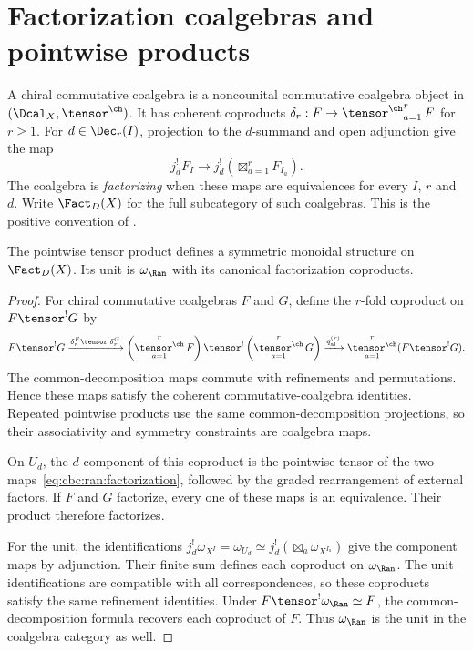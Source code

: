 \section{Factorization coalgebras and pointwise products}
A chiral commutative coalgebra is a noncounital commutative coalgebra
object in $(\Dcal_X,\tensor^{\ch})$.
It has coherent coproducts
$\delta_r:F\to\mathop{\tensor^{\ch}}_{a=1}^r F$ for $r\geq1$.
For $d\in\Dec_r(I)$, projection to the $d$-summand and open adjunction
give the map
\begin{equation}
 j_d^!F_I\longrightarrow
 j_d^!\left(\mathop{\boxtimes}_{a=1}^rF_{I_a}\right).
 \label{eq:cbc:ran:factorization}
\end{equation}
The coalgebra is \emph{factorizing} when these maps are equivalences
for every $I$, $r$ and $d$.
Write $\Fact_D(X)$ for the full subcategory of such coalgebras.
This is the positive convention of \cite[\S2.4]{FG12}.

\begin{proposition}
\label{cbc:ran:pointwise}
The pointwise tensor product defines a symmetric monoidal structure
on $\Fact_D(X)$. Its unit is $\omega_{\Ran}$ with its canonical
factorization coproducts.
\end{proposition}
\begin{proof}
For chiral commutative coalgebras $F$ and $G$, define the $r$-fold
coproduct on $F\tensor^!G$ by
\[
 F\tensor^!G
 \xrightarrow{\delta_r^F\tensor^!\delta_r^G}
 \left(\mathop{\tensor^{\ch}}_{a=1}^rF\right)
 \tensor^!
 \left(\mathop{\tensor^{\ch}}_{a=1}^rG\right)
 \xrightarrow{q_{\mathrm{al}}^{(r)}}
 \mathop{\tensor^{\ch}}_{a=1}^r(F\tensor^!G).
\]
The common-decomposition maps commute with refinements and permutations.
Hence these maps satisfy the coherent commutative-coalgebra identities.
Repeated pointwise products use the same common-decomposition projections,
so their associativity and symmetry constraints are coalgebra maps.

On $U_d$, the $d$-component of this coproduct is the pointwise tensor
of the two maps~\eqref{eq:cbc:ran:factorization}, followed by the graded
rearrangement of external factors. If $F$ and $G$ factorize, every
one of these maps is an equivalence. Their product therefore factorizes.

For the unit, the identifications
$j_d^!\omega_{X^I}=\omega_{U_d}
 \simeq j_d^!(\boxtimes_a\omega_{X^{I_a}})$
give the component maps by adjunction.
Their finite sum defines each coproduct on $\omega_{\Ran}$.
The unit identifications are compatible with all correspondences,
so these coproducts satisfy the same refinement identities.
Under $F\tensor^!\omega_{\Ran}\simeq F$, the common-decomposition
formula recovers each coproduct of $F$.
Thus $\omega_{\Ran}$ is the unit in the coalgebra category as well.
\end{proof}

